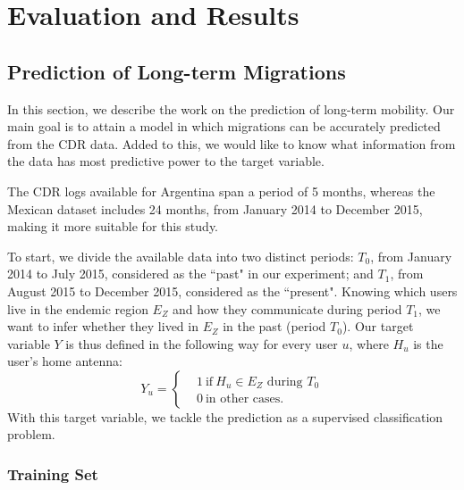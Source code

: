 
\chapter{Evaluation and Results}\label{cha:evaluation-results}


\section{Prediction of Long-term Migrations} \label{long_term}

In this section, we describe the work on the prediction of long-term mobility. Our main goal is to attain a model in which migrations can be accurately predicted from the CDR data. Added to this, we would like to know what information from the data has most predictive power to the target variable.

The CDR logs available for Argentina span a period of 5 months, 
whereas the Mexican dataset includes 24 months, from January 2014 to December 2015, making it more suitable for this study.

To start, we divide the available data into two distinct periods:
$T_0$, from January 2014 to July 2015, considered as the ``past" in our experiment;
and $T_1$, from August 2015 to December 2015, considered as the ``present".
Knowing which users live in the endemic region $E_Z$ and how they communicate
during period $T_1$,
we want to infer whether they lived in $E_Z$ in the past (period $T_0$).
Our target variable $Y$ is thus defined in the following way for every user $u$,
where $H_u$ is the user's home antenna: 
\[
Y_u =
\begin{cases}
&1 \ \mbox{if} \ H_u \in E_Z \mbox{ during } T_0 \\
&0 \ \mbox{in other cases}.
\end{cases}
\]
With this target variable, we tackle the prediction as a supervised classification problem.


\subsection{Training Set}

